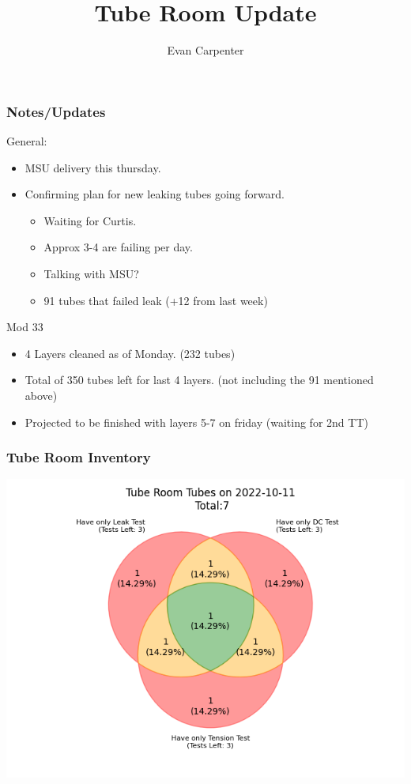 \documentclass{beamer}
\title{Tube Room Update}
\author{Evan Carpenter}
\begin{document}
\begin{frame}
	\titlepage
\end{frame}

\begin{frame}
	\frametitle{Notes/Updates}
	\begin{block}{General:}
		\begin{itemize}
			\item MSU delivery this thursday. 
			\item Confirming plan for new leaking tubes going forward. 
			\begin{itemize}
				\item Waiting for Curtis. 
				\item Approx 3-4 are failing per day. 
				\item Talking with MSU?
				\item 91 tubes that failed leak (+12 from last week)
			\end{itemize}
		\end{itemize}
	\end{block}
	\begin{block}{Mod 33}
		\begin{itemize}
			\item 4 Layers cleaned as of Monday. (232 tubes)
			\item Total of 350 tubes left for last 4 layers. (not including the 91 mentioned above) 
			\item Projected to be finished with layers 5-7 on friday (waiting for 2nd TT)
		\end{itemize}
	\end{block}
\end{frame}

\begin{frame}
	\frametitle{Tube Room Inventory}
	\includegraphics[width=\linewidth]{"tubepopulation.png"}
\end{frame}
\end{document}
